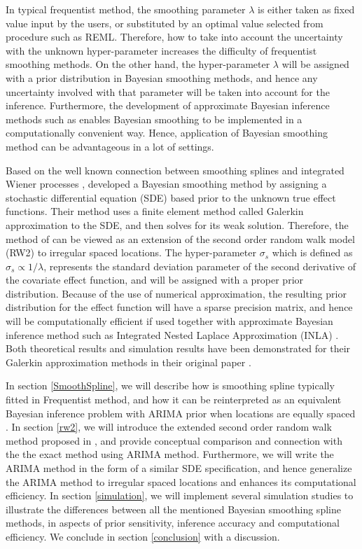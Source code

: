 \documentclass{article}
\begin{document}
In typical frequentist method, the smoothing parameter $\lambda$ is either taken as fixed value input by the users, or substituted by an optimal value selected from procedure such as REML. Therefore, how to take into account the uncertainty with the unknown hyper-parameter increases the difficulty of frequentist smoothing methods. On the other hand, the hyper-parameter $\lambda$ will be assigned with a prior distribution in Bayesian smoothing methods, and hence any uncertainty involved with that parameter will be taken into account for the inference. Furthermore, the development of approximate Bayesian inference methods such as \cite{inla} enables Bayesian smoothing to be implemented in a computationally convenient way. Hence, application of Bayesian smoothing method can be advantageous in a lot of settings.


Based on the well known connection between smoothing splines and integrated Wiener processes \citep{wahba}, \cite{rw2} developed a Bayesian smoothing method by assigning a stochastic differential equation (SDE) based prior to the unknown true effect functions. 
Their method uses a finite element method called Galerkin approximation to the SDE, and then solves for its weak solution. Therefore, the method of \cite{inla} can be viewed as an extension of the second order random walk model (RW2) to irregular spaced locations.
The hyper-parameter $\sigma_s$ which is defined as $\sigma_s \propto 1/\lambda$, represents the standard deviation parameter of the second derivative of the covariate effect function, and will be assigned with a proper prior distribution. Because of the use of numerical approximation, the resulting prior distribution for the effect function will have a sparse precision matrix, and hence will be computationally efficient if used together with approximate Bayesian inference method such as Integrated Nested Laplace Approximation (INLA) \citep{inla}. Both theoretical results and simulation results have been demonstrated for their Galerkin approximation methods in their original paper \citep{rw2}.


In section \ref{SmoothSpline}, we will describe how is smoothing spline typically fitted in Frequentist method, and how it can be reinterpreted as an equivalent Bayesian inference problem with ARIMA prior when locations are equally spaced \citep{ARIMA}. In section \ref{rw2}, we will introduce the extended second order random walk method proposed in \cite{rw2}, and provide conceptual comparison and connection with the the exact method using ARIMA method. Furthermore, we will write the ARIMA method in the form of a similar SDE specification, and hence generalize the ARIMA method to irregular spaced locations and enhances its computational efficiency. In section \ref{simulation}, we will implement several simulation studies to illustrate the differences between all the mentioned Bayesian smoothing spline methods, in aspects of prior sensitivity, inference accuracy and computational efficiency. We conclude in section \ref{conclusion} with a discussion.
\end{document}
